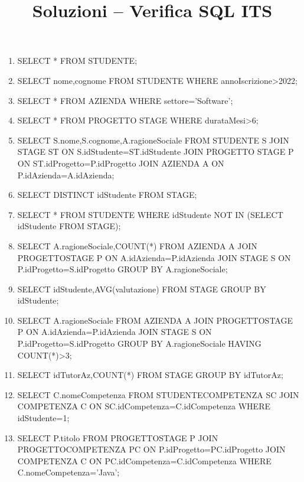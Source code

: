 \documentclass[a4paper,11pt]{article}
\title{Soluzioni – Verifica SQL ITS}
\date{}
\begin{document}
	\maketitle
	
	\begin{enumerate}
		
		\item SELECT * FROM STUDENTE;
		
		\item SELECT nome,cognome
		FROM STUDENTE
		WHERE annoIscrizione>2022;
		
		\item SELECT *
		FROM AZIENDA
		WHERE settore='Software';
		
		\item SELECT *
		FROM PROGETTO STAGE
		WHERE durataMesi>6;
		
		\item SELECT S.nome,S.cognome,A.ragioneSociale
		FROM STUDENTE S
		JOIN STAGE ST ON S.idStudente=ST.idStudente
		JOIN PROGETTO STAGE P ON ST.idProgetto=P.idProgetto
		JOIN AZIENDA A ON P.idAzienda=A.idAzienda;
		
		\item SELECT DISTINCT idStudente
		FROM STAGE;
		
		\item SELECT *
		FROM STUDENTE
		WHERE idStudente NOT IN
		(SELECT idStudente FROM STAGE);
		
		\item SELECT A.ragioneSociale,COUNT(*)
		FROM AZIENDA A
		JOIN PROGETTOSTAGE P ON A.idAzienda=P.idAzienda
		JOIN STAGE S ON P.idProgetto=S.idProgetto
		GROUP BY A.ragioneSociale;
		
		\item SELECT idStudente,AVG(valutazione)
		FROM STAGE
		GROUP BY idStudente;
		
		\item SELECT A.ragioneSociale
		FROM AZIENDA A
		JOIN PROGETTOSTAGE P ON A.idAzienda=P.idAzienda
		JOIN STAGE S ON P.idProgetto=S.idProgetto
		GROUP BY A.ragioneSociale
		HAVING COUNT(*)>3;
		
		\item SELECT idTutorAz,COUNT(*)
		FROM STAGE
		GROUP BY idTutorAz;
		
		\item SELECT C.nomeCompetenza
		FROM STUDENTECOMPETENZA SC
		JOIN COMPETENZA C
		ON SC.idCompetenza=C.idCompetenza
		WHERE idStudente=1;
		
		\item SELECT P.titolo
		FROM PROGETTOSTAGE P
		JOIN PROGETTOCOMPETENZA PC
		ON P.idProgetto=PC.idProgetto
		JOIN COMPETENZA C
		ON PC.idCompetenza=C.idCompetenza
		WHERE C.nomeCompetenza='Java';
		

\end{enumerate}
\end{document}
